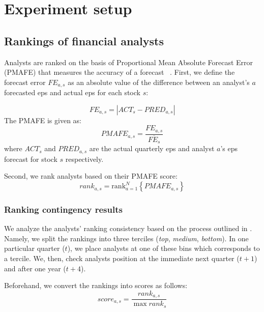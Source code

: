 \documentclass[a4paper,twoside,12pt,openright,notitlepage]{report}\usepackage[]{graphicx}\usepackage[]{color}
\begin{document}
\section{Experiment setup}
\label{ch3-sec:exp_setup}
\subsection{Rankings of financial analysts}
\label{ch3:eps-rank}
Analysts are ranked on the basis of Proportional Mean Absolute Forecast Error (PMAFE) that measures the accuracy of a forecast ~\citep{clement1999,brown2001,ertimur2007}. First,  we define the forecast  error  $FE_{a,s}$ as an absolute value of the difference between an analyst's $a$ forecasted \gls{eps}  and actual \gls{eps} for each stock $s$:

\begin{equation}
FE_{a,s}=|{ACT_{s}-PRED_{a,s}}|
\end{equation}
The PMAFE is given as:
\begin{equation}
PMAFE_{a,s}= \frac{FE_{a,s}}{\overline{FE_{s}}}
\end{equation}
where $ACT_{s}$ and $PRED_{a,s}$ are the actual quarterly \gls{eps} and  analyst $a$'s \gls{eps} forecast for stock $s$ respectively.

Second, we rank analysts based on their PMAFE score:
\begin{equation}
\label{ch3-eps:rank}
rank_{a,s}=\mathrm{rank}_{a=1}^{N} \left\{ PMAFE_{a,s} \right\}
\end{equation}



\subsubsection{Ranking contingency results}
\label{ch3-tab:rank-contin}

We analyze the analysts' ranking consistency based on the process outlined in \cite{aiguzhinov2015a}.  Namely, we split the rankings into three terciles (\textit{top}, \textit{medium}, \textit{bottom}). In one particular quarter ($t$), we place  analysts at one of these bins which corresponds to a tercile. We, then,  check analysts position at the immediate next quarter ($t+1$) and after one year ($t+4$).

Beforehand, we convert the rankings into scores as follows:
\begin{equation}
\label{ch3-eq:score}
score_{a,s}=\frac{rank_{a,s}}{\max{rank_s}}
\end{equation}
\end{document}
